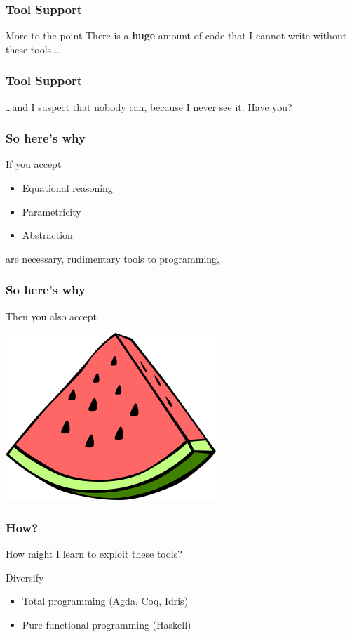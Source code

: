\begin{frame}
\frametitle{Tool Support}
\begin{block}{More to the point}
There is a \textbf{huge} amount of code that I cannot write without these tools \ldots
\end{block}
\end{frame}


\begin{frame}
\frametitle{Tool Support}
\begin{block}{\ldots and I suspect}
that nobody can, because I never see it. \tiny{Have you?}\normalsize
\end{block}
\end{frame}


\begin{frame}
\frametitle{So here's why}
\begin{block}{If you accept}
\begin{itemize}
  \item Equational reasoning
  \item Parametricity
  \item Abstraction
\end{itemize}
are necessary, rudimentary tools to programming,
\end{block}
\end{frame}


\begin{frame}
\frametitle{So here's why}
\begin{block}{Then you also accept}
\begin{center}
\includegraphics[width=0.3\paperwidth]{image/watermelon.png}
\end{center}
\end{block}
\end{frame}


\begin{frame}
\frametitle{How?}
\begin{block}{How might I learn to exploit these tools?}
\begin{center}
\huge{Diversify}\normalsize
\end{center}
\begin{itemize}
  \item Total programming (Agda, Coq, Idris)
  \item Pure functional programming (Haskell)
\end{itemize}
\end{block}
\end{frame}


